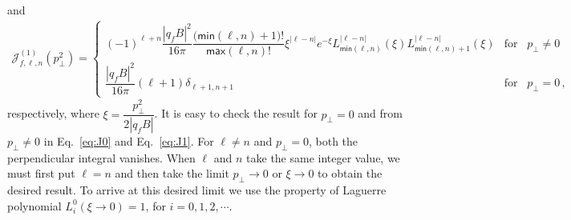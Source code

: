 \documentclass[aps,prd,floatfix,showpacs,showkeys,superscriptadress,unsortedaddress,nofootinbib,onecolumn]{revtex4-1}
\newcommand{\sF}{\scriptscriptstyle{f}}
\newcommand{\sperp}{\scriptscriptstyle{\perp}}
\begin{document}
and
\begin{align}
\mathcal{J}^{(1)}_{f,\ell,n}(p_{\sperp}^2) =
\begin{cases}
 (-1)^{\ell+n}\dfrac{|q_{\sF}B|^2}{16\pi}\dfrac{\big(\textsf{min}(\ell,n)+1\big)!}{\textsf{max}(\ell,n)!}\xi^{|\ell-n|}e^{-\xi}L_{\textsf{min}(\ell,n)}^{|\ell-n|}(\xi)L_{\textsf{min}(\ell,n)+1}^{|\ell-n|}(\xi) & \text{for  } \,\,\,p_{\sperp}\neq 0\\
\dfrac{|q_{\sF}B|^2}{16\pi}(\ell+1)\delta_{\ell+1, n+1} & \text{for  } \,\,\,p_{\sperp} = 0\,, 
 \end{cases} \label{eq:J1}
\end{align}
respectively, where $\xi = \dfrac{p_{\sperp}^2}{2|q_{\sF}B|}$.  It is easy to check the result for $p_{\sperp}=0$ and from $p_{\sperp}\neq 0$ in Eq.~\eqref{eq:J0} and Eq.~\eqref{eq:J1}. For $\ell\neq n$ and $p_{\sperp}=0$,  both the perpendicular integral vanishes.  When $\ell$ and $n$ take the same integer value, we must first put $\ell=n$ and then take the limit $p_{\sperp}\rightarrow 0$ or $\xi\rightarrow 0$ to obtain the desired result. To arrive at this desired limit we use the property of Laguerre polynomial $L^0_{i}(\xi\rightarrow 0)=1$, for $i=0,1,2,\cdots$.  
 
\end{document}

